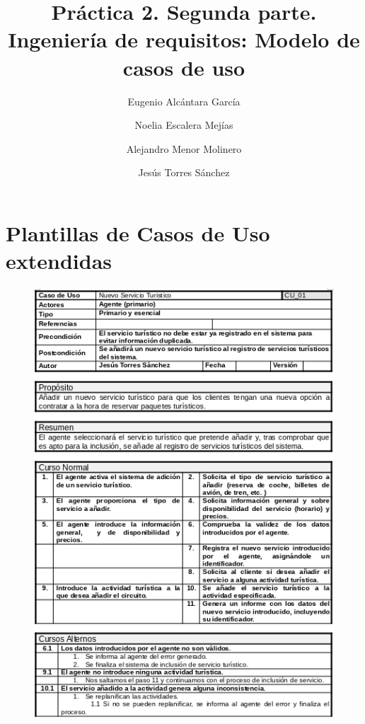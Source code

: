 \documentclass{article}
\title{Práctica 2. Segunda parte. Ingeniería de requisitos: Modelo de casos de uso}
\author{Eugenio Alcántara García\\
		\and Noelia Escalera Mejías\\
		\and Alejandro Menor Molinero\\
		\and Jesús Torres Sánchez}
\begin{document}
	\maketitle
	\section{Plantillas de Casos de Uso extendidas}
	\begin{figure}[H]
		\centering
		\includegraphics[totalheight=12cm]{cu-1}
	\end{figure}
	
	
	
	
\end{document}
